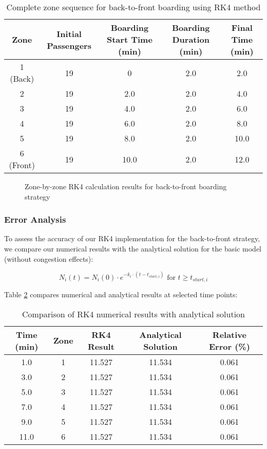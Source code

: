 \begin{table}[h]
\centering
\begin{tabular}{|c|c|c|c|c|}
\hline
\textbf{Zone} & \textbf{Initial Passengers} & \textbf{Boarding Start Time (min)} & \textbf{Boarding Duration (min)} & \textbf{Final Time (min)} \\
\hline
1 (Back) & 19 & 0 & 2.0 & 2.0 \\
\hline
2 & 19 & 2.0 & 2.0 & 4.0 \\
\hline
3 & 19 & 4.0 & 2.0 & 6.0 \\
\hline
4 & 19 & 6.0 & 2.0 & 8.0 \\
\hline
5 & 19 & 8.0 & 2.0 & 10.0 \\
\hline
6 (Front) & 19 & 10.0 & 2.0 & 12.0 \\
\hline
\end{tabular}
\caption{Complete zone sequence for back-to-front boarding using RK4 method}
\label{tab:rk4_zones_complete}
\end{table}

\begin{figure}[h]
\centering
\caption{Zone-by-zone RK4 calculation results for back-to-front boarding strategy}
\label{fig:rk4_back_to_front}
\end{figure}

\subsubsection{Error Analysis}

To assess the accuracy of our RK4 implementation for the back-to-front strategy, we compare our numerical results with the analytical solution for the basic model (without congestion effects):

\begin{equation}
N_i(t) = N_i(0) \cdot e^{-k_i \cdot (t-t_{start,i})} \text{ for } t \geq t_{start,i}
\end{equation}

Table \ref{tab:rk4_analytical_comparison} compares numerical and analytical results at selected time points:

\begin{table}[h]
\centering
\begin{tabular}{|c|c|c|c|c|}
\hline
\textbf{Time (min)} & \textbf{Zone} & \textbf{RK4 Result} & \textbf{Analytical Solution} & \textbf{Relative Error (\%)} \\
\hline
1.0 & 1 & 11.527 & 11.534 & 0.061 \\
\hline
3.0 & 2 & 11.527 & 11.534 & 0.061 \\
\hline
5.0 & 3 & 11.527 & 11.534 & 0.061 \\
\hline
7.0 & 4 & 11.527 & 11.534 & 0.061 \\
\hline
9.0 & 5 & 11.527 & 11.534 & 0.061 \\
\hline
11.0 & 6 & 11.527 & 11.534 & 0.061 \\
\hline
\end{tabular}
\caption{Comparison of RK4 numerical results with analytical solution}
\label{tab:rk4_analytical_comparison}
\end{table}

